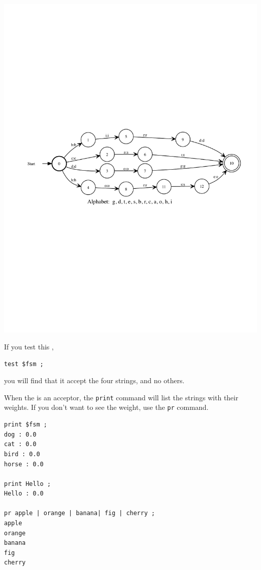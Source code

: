 \begin{center}
\includegraphics[width=135mm]{images/dogcatbirdhorse.pdf}
\end{center}

\noindent
If you test this \fsm{}, 

\begin{Verbatim}
test $fsm ;
\end{Verbatim}

\noindent
you will find that it accept the four strings, and no others.

When the \fsm{} is an acceptor, the \texttt{print} command will list the strings with their
weights.  If you don't want to see the weight, use the \texttt{pr} command.

\begin{Verbatim}
print $fsm ;
dog : 0.0
cat : 0.0
bird : 0.0
horse : 0.0

print Hello ;
Hello : 0.0

pr apple | orange | banana| fig | cherry ;
apple
orange
banana
fig
cherry
\end{Verbatim}

